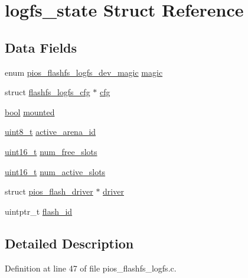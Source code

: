 \hypertarget{structlogfs__state}{\section{logfs\-\_\-state Struct Reference}
\label{structlogfs__state}
}
\subsection*{Data Fields}
\begin{DoxyCompactItemize}
\item 
enum \hyperlink{group___p_i_o_s___f_l_a_s_h_f_s_ga27472bb2a0fbfb6302378ef138c6a41f}{pios\-\_\-flashfs\-\_\-logfs\-\_\-dev\-\_\-magic} \hyperlink{structlogfs__state_acbcddf457808c9af84d6441f4f34be1e}{magic}
\item 
struct \hyperlink{structflashfs__logfs__cfg}{flashfs\-\_\-logfs\-\_\-cfg} $\ast$ \hyperlink{structlogfs__state_aaa095628949748fcf88691272e19689e}{cfg}
\item 
\hyperlink{group___exported__types_gaf6a258d8f3ee5206d682d799316314b1}{bool} \hyperlink{structlogfs__state_a5d12393331e2e5d7d9141f4437e09ccf}{mounted}
\item 
\hyperlink{stdint_8h_aba7bc1797add20fe3efdf37ced1182c5}{uint8\-\_\-t} \hyperlink{structlogfs__state_a5bcf852bc8ba378be9bf82a602070073}{active\-\_\-arena\-\_\-id}
\item 
\hyperlink{stdint_8h_a273cf69d639a59973b6019625df33e30}{uint16\-\_\-t} \hyperlink{structlogfs__state_a3c61a652819a886351af3431c8fe2061}{num\-\_\-free\-\_\-slots}
\item 
\hyperlink{stdint_8h_a273cf69d639a59973b6019625df33e30}{uint16\-\_\-t} \hyperlink{structlogfs__state_a9606319a5f23b1dee579106c84bf198b}{num\-\_\-active\-\_\-slots}
\item 
struct \hyperlink{structpios__flash__driver}{pios\-\_\-flash\-\_\-driver} $\ast$ \hyperlink{structlogfs__state_a739ae114cf41b74afe9f40cd312c677e}{driver}
\item 
uintptr\-\_\-t \hyperlink{structlogfs__state_a29a28723508e259cd39e4ce4bff7827d}{flash\-\_\-id}
\end{DoxyCompactItemize}


\subsection{Detailed Description}


Definition at line 47 of file pios\-\_\-flashfs\-\_\-logfs.\-c.




